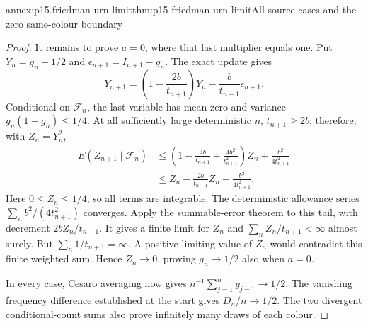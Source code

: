 \begin{annexitem}{annex:p15.friedman-urn-limit}{thm:p15-friedman-urn-limit}{All source cases and the zero same-colour boundary}
\begin{proof}
It remains to prove \(a=0\), where that last multiplier equals one.
Put \(Y_n=g_n-1/2\) and
\(\epsilon_{n+1}=I_{n+1}-g_n\).
The exact update gives
\[
             Y_{n+1}
                =\left(1-\frac{2b}{t_{n+1}}\right)Y_n
                       -\frac b{t_{n+1}}\epsilon_{n+1}.
\]
Conditional on \(\mathcal F_n\), the last variable has mean
zero and variance \(g_n(1-g_n)\leq1/4\).
At all sufficiently large deterministic \(n\), \(t_{n+1}\geq2b\);
therefore, with \(Z_n=Y_n^2\),
\[
 \begin{aligned}
 E(Z_{n+1}\mid\mathcal F_n)
   &\leq\left(1-\frac{4b}{t_{n+1}}
                    +\frac{4b^2}{t_{n+1}^2}\right)Z_n
                        +\frac{b^2}{4t_{n+1}^2}\\
   &\leq Z_n-\frac{2b}{t_{n+1}}Z_n+\frac{b^2}{4t_{n+1}^2}.
 \end{aligned}
\]
Here \(0\leq Z_n\leq1/4\), so all terms are integrable.
The deterministic allowance series \(\sum_n b^2/(4t_{n+1}^2)\)
converges. Apply the summable-error theorem to this tail,
with decrement \(2bZ_n/t_{n+1}\).
It gives a finite limit for \(Z_n\) and
\(\sum_n Z_n/t_{n+1}<\infty\) almost surely.
But \(\sum_n1/t_{n+1}=\infty\).
A positive limiting value of \(Z_n\) would contradict this
finite weighted sum. Hence \(Z_n\to0\), proving \(g_n\to1/2\)
also when \(a=0\).

In every case, Cesaro averaging now gives
\(n^{-1}\sum_{j=1}^ng_{j-1}\to1/2\).
The vanishing frequency difference established at the start
gives \(D_n/n\to1/2\). The two divergent conditional-count
sums also prove infinitely many draws of each colour.
\end{proof}
\end{annexitem}


